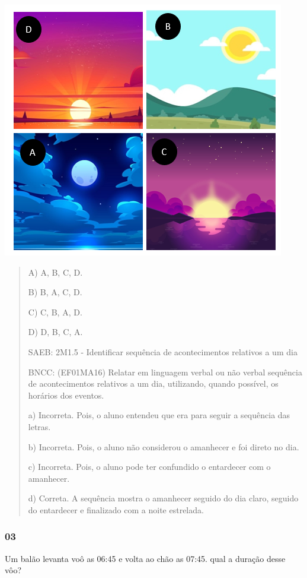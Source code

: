 \includegraphics[width=4.85484in,height=4.39645in]{media/image46.png}

\begin{quote}
A) A, B, C, D.

B) B, A, C, D.

C) C, B, A, D.

D) D, B, C, A.

SAEB: 2M1.5 - Identificar sequência de acontecimentos relativos a um dia

BNCC: (EF01MA16) Relatar em linguagem verbal ou não verbal sequência de
acontecimentos relativos a um dia, utilizando, quando possível, os
horários dos eventos.

a) Incorreta. Pois, o aluno entendeu que era para seguir a sequência das
letras.

b) Incorreta. Pois, o aluno não considerou o amanhecer e foi direto no
dia.

c) Incorreta. Pois, o aluno pode ter confundido o entardecer com o
amanhecer.

d) Correta. A sequência mostra o amanhecer seguido do dia claro, seguido
do entardecer e finalizado com a noite estrelada.
\end{quote}

\subsubsection{03}\label{section-53}

Um balão levanta voô as 06:45 e volta ao chão as 07:45. qual a duração
desse vôo?

